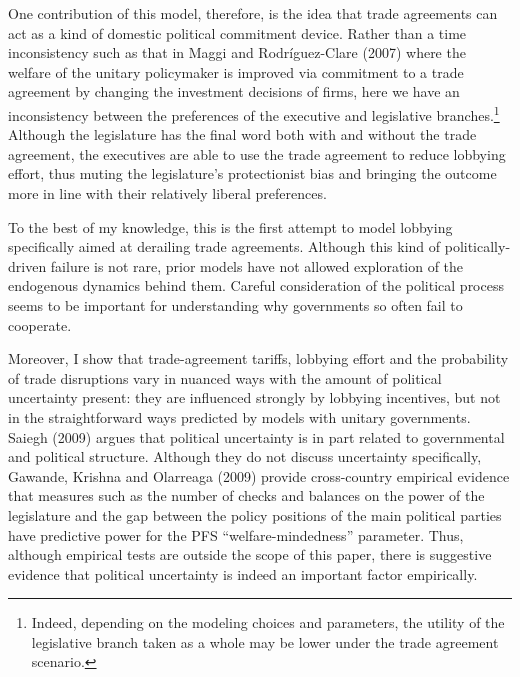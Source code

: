 \documentclass[10pt]{article}
\begin{document}
One contribution of this model, therefore, is the idea that trade agreements can act as a kind of domestic political commitment device. Rather than a time inconsistency such as that in Maggi and Rodr\'{i}guez-Clare (2007) where the welfare of the unitary policymaker is improved via commitment to a trade agreement by changing the investment decisions of firms, here we have an inconsistency between the preferences of the executive and legislative branches.\footnote{Indeed, depending on the modeling choices and parameters, the utility of the legislative branch taken as a whole may be lower under the trade agreement scenario.} Although the legislature has the final word both with and without the trade agreement, the executives are able to use the trade agreement to reduce lobbying effort, thus muting the legislature's protectionist bias and bringing the outcome more in line with their relatively liberal preferences.

To the best of my knowledge, this is the first attempt to model lobbying specifically aimed at derailing trade agreements. Although this kind of politically-driven failure is not rare, prior models have not allowed exploration of the endogenous dynamics behind them. Careful consideration of the political process seems to be important for understanding why governments so often fail to cooperate.

Moreover, I show that trade-agreement tariffs, lobbying effort and the probability of trade disruptions vary in nuanced ways with the amount of political uncertainty present: they are influenced strongly by lobbying incentives, but not in the straightforward ways predicted by models with unitary governments. Saiegh (2009) argues that political uncertainty is in part related to governmental and political structure. Although they do not discuss uncertainty specifically, Gawande, Krishna and Olarreaga (2009) provide cross-country empirical evidence that measures such as the number of checks and balances on the power of the legislature and the gap between the policy positions of the main political parties have predictive power for the PFS ``welfare-mindedness'' parameter. Thus, although empirical tests are outside the scope of this paper, there is suggestive evidence that political uncertainty is indeed an important factor empirically.
\end{document}
